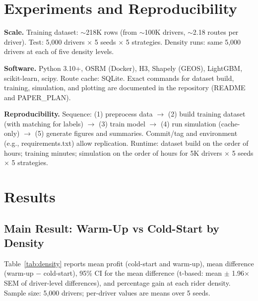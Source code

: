 \documentclass[11pt,a4paper]{article}
\begin{document}
\section{Experiments and Reproducibility}
\label{sec:experiments}

\textbf{Scale.} Training dataset: $\sim$218K rows (from $\sim$100K drivers, $\sim$2.18 routes per driver). Test: 5,000 drivers $\times$ 5 seeds $\times$ 5 strategies. Density runs: same 5,000 drivers at each of five density levels.

\textbf{Software.} Python 3.10+, OSRM (Docker), H3, Shapely (GEOS), LightGBM, scikit-learn, scipy. Route cache: SQLite. Exact commands for dataset build, training, simulation, and plotting are documented in the repository (README and PAPER\_PLAN).

\textbf{Reproducibility.} Sequence: (1) preprocess data $\to$ (2) build training dataset (with matching for labels) $\to$ (3) train model $\to$ (4) run simulation (cache-only) $\to$ (5) generate figures and summaries. Commit/tag and environment (e.g., requirements.txt) allow replication. Runtime: dataset build on the order of hours; training minutes; simulation on the order of hours for 5K drivers $\times$ 5 seeds $\times$ 5 strategies.

\section{Results}
\label{sec:results}

\subsection{Main Result: Warm-Up vs Cold-Start by Density}

Table~\ref{tab:density} reports mean profit (cold-start and warm-up), mean difference (warm-up $-$ cold-start), 95\% CI for the mean difference (t-based: mean $\pm$ 1.96$\times$SEM of driver-level differences), and percentage gain at each rider density. Sample size: 5,000 drivers; per-driver values are means over 5 seeds.
\end{document}
